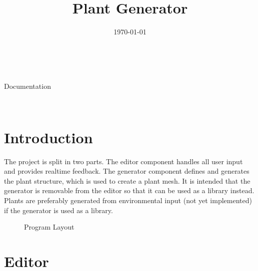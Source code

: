 \documentclass[11pt,letterpaper]{article}
\title{Plant Generator}
\date{\today}
\begin{document}
\begin{center}
	\begin{figure}
		\centering
		\def\svgscale{1.5}
		
	\end{figure}
	\begin{huge} \@title \end{huge} \\
	\vspace{1em}
	\begin{LARGE} Documentation \end{LARGE} \\
	\vspace{1em}
	\@date
\end{center}
\tableofcontents
\pagebreak

\section{Introduction}

The project is split in two parts. The editor component handles all user input and provides realtime feedback. The generator component defines and generates the plant structure, which is used to create a plant mesh. It is intended that the generator is removable from the editor so that it can be used as a library instead. Plants are preferably generated from environmental input (not yet implemented) if the generator is used as a library.

\vspace{2em}
\begin{figure}[H]
\centering
{}
\caption{Program Layout}
\end{figure}

\section{Editor}
\end{document}
